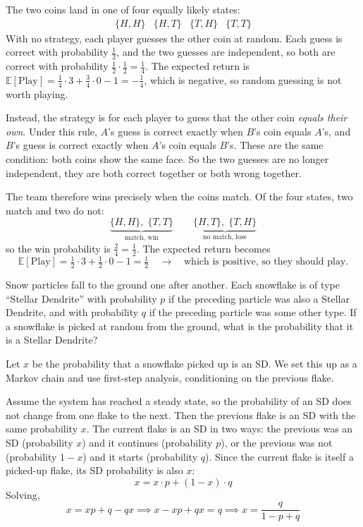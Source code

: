 \begin{solution}
The two coins land in one of four equally likely states:
\[
  \begin{array}{cccc}
    \{H,H\} & \{H,T\} & \{T,H\} & \{T,T\}
  \end{array}
\]
With no strategy, each player guesses the other coin at random. Each guess is
correct with probability $\tfrac12$, and the two guesses are independent, so both
are correct with probability $\tfrac12 \cdot \tfrac12 = \tfrac14$. The expected
return is $\mathbb{E}[\text{Play}] = \tfrac14 \cdot 3 + \tfrac34 \cdot 0 - 1 = -\tfrac14$, which is negative, so random guessing is not worth playing. 

Instead, the strategy is for each player to guess that the other coin \textit{equals their
own}. Under this rule, $A$'s guess is correct exactly when $B$'s coin equals
$A$'s, and $B$'s guess is correct exactly when $A$'s coin equals $B$'s. These are
the same condition: both coins show the same face. So the two guesses are no
longer independent, they are both correct together or both wrong together.

The team therefore wins precisely when the coins match. Of the four states, two
match and two do not:
\[
  \underbrace{\{H,H\}, \; \{T,T\}}_{\text{match, win}}
  \qquad
  \underbrace{\{H,T\}, \; \{T,H\}}_{\text{no match, lose}}
\]
so the win probability is $\tfrac24 = \tfrac12$. The expected return becomes
\[
  \mathbb{E}[\text{Play}] = \tfrac12 \cdot 3 + \tfrac12 \cdot 0 - 1 = \tfrac12 \quad \longrightarrow \quad \text{which is positive, so they should play.}
\]
\end{solution}

\begin{problem}
Snow particles fall to the ground one after another. Each snowflake is of type
``Stellar Dendrite'' with probability $p$ if the preceding particle was also a
Stellar Dendrite, and with probability $q$ if the preceding particle was some
other type. If a snowflake is picked at random from the ground, what is the
probability that it is a Stellar Dendrite?
\end{problem}

\begin{solution}
Let $x$ be the probability that a snowflake picked up is an SD. We set this up as
a Markov chain and use first-step analysis, conditioning on the previous flake.

Assume the system has reached a steady state, so the probability of an SD does not
change from one flake to the next. Then the previous flake is an SD with the same
probability $x$. The current flake is an SD in two ways: the previous was an SD
(probability $x$) and it continues (probability $p$), or the previous was not
(probability $1 - x$) and it starts (probability $q$). Since the current flake is
itself a picked-up flake, its SD probability is also $x$:
\[
  x = x \cdot p + (1 - x) \cdot q
\]
Solving,
\[
  x = xp + q - qx \implies x - xp + qx = q \implies x = \frac{q}{1 - p + q}
\]
\end{solution}

